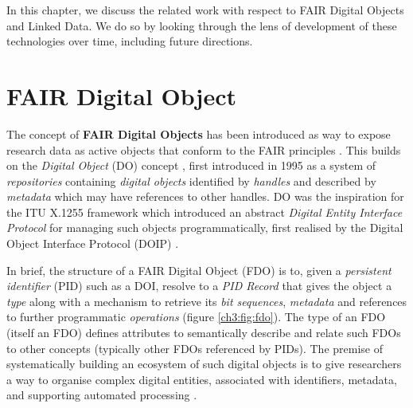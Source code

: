 \label{ch3:background}

In this chapter, we discuss the related work with respect to FAIR Digital Objects and Linked Data. We do so by looking through the lens of development of these technologies over time, including future directions.

\section{FAIR Digital Object}\label{ch3:fdo}

The concept of \textbf{FAIR Digital Objects} \cite{schultesFAIRPrinciplesDigital2019a} has been introduced as way to expose research data as active objects that conform to the FAIR principles \cite{Wilkinson 2016}. This builds on the \emph{Digital Object} (DO) concept \cite{kahnFrameworkDistributedDigital2006b}, first introduced in 1995 \cite{kahnFrameworkDistributedDigital1995a} as a system of \emph{repositories} containing \emph{digital objects} identified by \emph{handles} and described by \emph{metadata} which may have references to other handles. DO was the inspiration for the ITU X.1255 framework \cite{x1255FrameworkDiscovery} which introduced an abstract \emph{Digital Entity Interface Protocol} for managing such objects programmatically, first realised by the Digital Object Interface Protocol (DOIP) \cite{DigitalObjectInterface}.

In brief, the structure of a FAIR Digital Object (FDO) is to, given a \emph{persistent identifier} (PID) such as a DOI, resolve to a \emph{PID Record} that gives the object a \emph{type} along with a mechanism to retrieve its \emph{bit sequences}, \emph{metadata} and references to further programmatic \emph{operations} (figure \vref{ch3:fig:fdo}). The type of an FDO (itself an FDO) defines attributes to semantically describe and relate such FDOs to other concepts (typically other FDOs referenced by PIDs). The premise of systematically building an ecosystem of such digital objects is to give researchers a way to organise complex digital entities, associated with identifiers, metadata, and supporting automated processing \cite{wittenburgDigitalObjectsDrivers2019a}.


